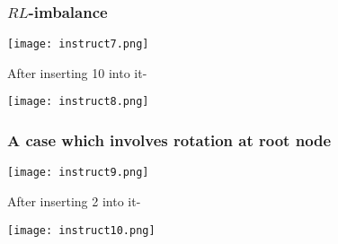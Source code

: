 \documentclass{article}
\begin{document}
\subsubsection{$RL$-imbalance}
\begin{center}
\texttt{[image: instruct7.png]}
\end{center}
After inserting 10 into it-
\begin{center}
\texttt{[image: instruct8.png]}
\end{center}

\subsubsection{A case which involves rotation at root node}
\begin{center}
\texttt{[image: instruct9.png]}
\end{center}
After inserting 2 into it-
\begin{center}
\texttt{[image: instruct10.png]}
\end{center}
\end{document}
